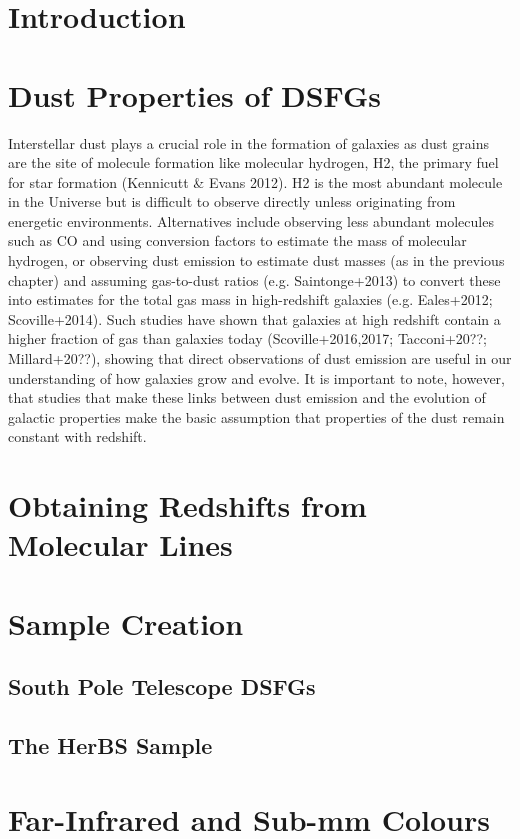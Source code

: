 \section{Introduction}
\section{Dust Properties of DSFGs}

Interstellar dust plays a crucial role in the formation of galaxies as dust grains are the site of molecule formation like molecular hydrogen, H2, the primary fuel for star formation (Kennicutt \& Evans 2012). H2 is the most abundant molecule in the Universe but is difficult to observe directly unless originating from energetic environments. Alternatives include observing less abundant molecules such as CO and using conversion factors to estimate the mass of molecular hydrogen, or observing dust emission to estimate dust masses (as in the previous chapter) and assuming gas-to-dust ratios (e.g. Saintonge+2013) to convert these into estimates for the total gas mass in high-redshift galaxies (e.g. Eales+2012; Scoville+2014). Such studies have shown that galaxies at high redshift contain a higher fraction of gas than galaxies today (Scoville+2016,2017; Tacconi+20??; Millard+20??), showing that direct observations of dust emission are useful in our understanding of how galaxies grow and evolve. It is important to note, however, that studies that make these links between dust emission and the evolution of galactic properties make the basic assumption that properties of the dust remain constant with redshift.

\section{Obtaining Redshifts from Molecular Lines}
\section{Sample Creation}
\subsection{South Pole Telescope DSFGs}
\subsection{The HerBS Sample}
\section{Far-Infrared and Sub-mm Colours}
